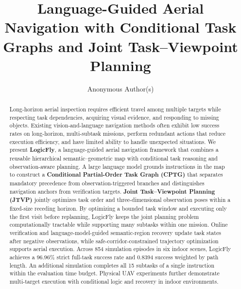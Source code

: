 \documentclass[letterpaper,10pt,journal]{IEEEtran}
\title{Language-Guided Aerial Navigation with Conditional Task Graphs and Joint Task--Viewpoint Planning}
\author{Anonymous Author(s)}
\begin{document}
\maketitle
\begin{abstract}
Long-horizon aerial inspection requires efficient travel among multiple targets while respecting task dependencies, acquiring visual evidence, and responding to missing objects. Existing vision-and-language navigation methods often exhibit low success rates on long-horizon, multi-subtask missions, perform redundant actions that reduce execution efficiency, and have limited ability to handle unexpected situations. We present \textbf{LogicFly}, a language-guided aerial navigation framework that combines a reusable hierarchical semantic--geometric map with conditional task reasoning and observation-aware planning. A large language model grounds instructions in the map to construct a \textbf{Conditional Partial-Order Task Graph (CPTG)} that separates mandatory precedence from observation-triggered branches and distinguishes navigation anchors from verification targets. \textbf{Joint Task--Viewpoint Planning (JTVP)} jointly optimizes task order and three-dimensional observation poses within a fixed-size receding horizon. By optimizing a bounded task window and executing only the first visit before replanning, LogicFly keeps the joint planning problem computationally tractable while supporting many subtasks within one mission. Online verification and language-model-guided semantic-region recovery update task states after negative observations, while safe-corridor-constrained trajectory optimization supports aerial execution. Across 854 simulation episodes in six indoor scenes, LogicFly achieves a 96.96\% strict full-task success rate and 0.8394 success weighted by path length. An additional simulation completes all 15 subtasks of a single instruction within the evaluation time budget. Physical UAV experiments further demonstrate multi-target execution with conditional logic and recovery in indoor environments.
\end{abstract}
\end{document}
